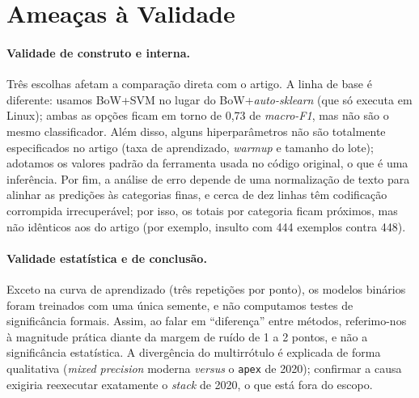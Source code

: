 \documentclass[sigconf, nonacm]{acmart}
\begin{document}
\section{Ameaças à Validade}
\label{sec:ameacas}
 
\paragraph{Validade de construto e interna.} Três escolhas afetam a
comparação direta com o artigo. A linha de base é diferente: usamos BoW+SVM
no lugar do BoW+\emph{auto-sklearn} (que só executa em Linux); ambas as opções
ficam em torno de 0,73 de \emph{macro-F1}, mas não são o mesmo
classificador. Além disso, alguns hiperparâmetros não são totalmente
especificados no artigo (taxa de aprendizado, \emph{warmup} e tamanho do
lote); adotamos os valores padrão da ferramenta usada no código original, o
que é uma inferência. Por fim, a análise de erro depende de uma normalização
de texto para alinhar as predições às categorias finas, e cerca de dez
linhas têm codificação corrompida irrecuperável; por isso, os totais por
categoria ficam próximos, mas não idênticos aos do artigo (por exemplo,
insulto com 444 exemplos contra 448).
 
\paragraph{Validade estatística e de conclusão.} Exceto na curva de
aprendizado (três repetições por ponto), os modelos binários foram
treinados com uma única semente, e não computamos testes de significância
formais. Assim, ao falar em ``diferença'' entre métodos, referimo-nos à
magnitude prática diante da margem de ruído de 1 a 2 pontos, e não a
significância estatística. A divergência do multirrótulo é explicada de
forma qualitativa (\emph{mixed precision} moderna \emph{versus} o \texttt{apex} de
2020); confirmar a causa exigiria reexecutar exatamente o \emph{stack} de
2020, o que está fora do escopo.
 
\end{document}
